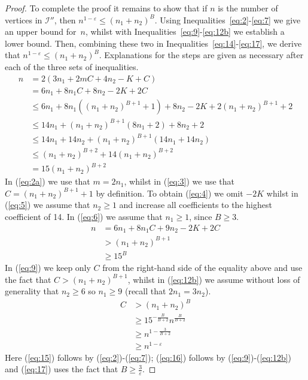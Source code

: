 \documentclass[preprint,12pt]{elsarticle}
\begin{document}
\begin{proof}
To complete the proof it remains to show that if $n$ is the number of vertices in $\mathcal I''$, then $n^{1-\varepsilon}\leq (n_1+n_2)^B$. 
Using Inequalities~\ref{eq:2}-\ref{eq:7} we give an upper bound for~$n$, whilst with Inequalities~\ref{eq:9}-\ref{eq:12b} we establish a lower bound. Then, combining these two in Inequalities~\ref{eq:14}-\ref{eq:17}, we derive that $n^{1-\varepsilon}\leq (n_1+n_2)^B$. Explanations for the steps are given as necessary after each of the three sets of inequalities.
\begin{align}
\label{eq:2}    n &= 2(3 n_1 + 2mC + 4n_2 -K + C) \\
\label{eq:2a} & =6 n_1 + 8n_1C + 8n_2 -2K + 2C \\ 
\label{eq:3}   &\leq 6 n_1 + 8n_1 ((n_1 + n_2)^{B+1} + 1) + 8n_2 - 2K + 2 (n_1 + n_2)^{B+1} + 2 \\
\label{eq:4}  &\leq 14 n_1 + (n_1 + n_2)^{B+1} (8 n_1 + 2) + 8n_2 + 2 \\
\label{eq:5}  &\leq 14 n_1 + 14 n_2 + (n_1 + n_2)^{B+1} (14 n_1 + 14n_2) \\
\label{eq:6} 	&\leq  (n_1 + n_2)^{B+2}  + 14(n_1 + n_2)^{B+2} \\
\label{eq:7} 	&=  15 (n_1 + n_2)^{B+2}
\end{align}
\noindent
In (\ref{eq:2a}) we use that $m=2n_1$, whilst in (\ref{eq:3}) we use that $C = (n_1 + n_2)^{B+1} + 1$ by definition.  To obtain (\ref{eq:4}) we omit $-2K$ whilst in (\ref{eq:5}) we assume that $n_2 \geq 1$ and increase all coefficients to the highest coefficient of 14.  In (\ref{eq:6}) we assume that $n_1\geq 1$, since $B\geq 3$.
\begin{align}
\label{eq:9}    n &=  6 n_1 + 8n_1C + 9n_2 -2K + 2C \\
\label{eq:11}     &>(n_1 + n_2)^{B+1}  \\
\label{eq:12b}     &\geq 15^B
\end{align}
\noindent
In (\ref{eq:9}) we keep only $C$ from the right-hand side of the equality above and use the fact that $C>(n_1+n_2)^{B+1}$, whilst in (\ref{eq:12b}) we assume without loss of generality that $n_2\geq 6$ so $n_1\geq 9$ (recall that $2n_1=3n_2$).
\begin{align}
\label{eq:14}C &>(n_1 + n_2)^B \\
\label{eq:15} &\geq 15^{- \frac{B}{B+2}} n^{\frac{B}{B+2}}\\
\label{eq:16} &\geq n^{1-\frac{3}{B+2}}\\
\label{eq:17}  &\geq n^{1-\varepsilon}
\end{align}
\noindent
Here (\ref{eq:15}) follows by (\ref{eq:2})-(\ref{eq:7}); (\ref{eq:16}) follows by (\ref{eq:9})-(\ref{eq:12b}) and (\ref{eq:17}) uses the fact that $B \geq \frac{3}{\varepsilon}$.
\end{proof}
\end{document}
